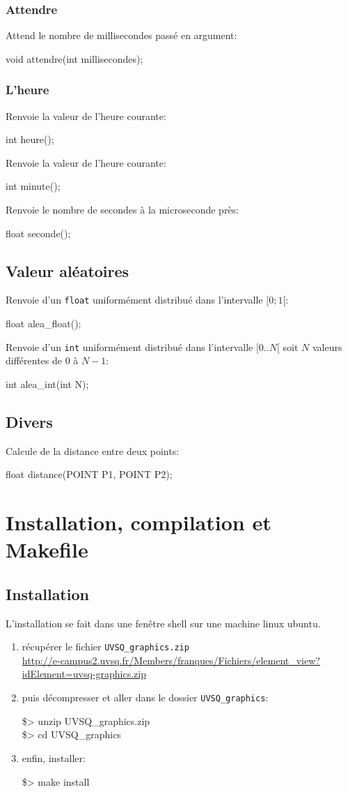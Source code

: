 \documentclass{report}
\newcommand\code[1]{
\begin{mdframed}[linecolor=purple,backgroundcolor=blue!10]
{\tt
#1
}
\end{mdframed}
}
\begin{document}
\subsection{Attendre}
Attend le nombre de millisecondes passé en argument:
\code{
void attendre(int millisecondes);
}

\subsection{L'heure}
Renvoie la valeur de l'heure courante:
\code{
int heure();
}

Renvoie la valeur de l'heure courante:
\code{
int minute();
}

Renvoie le nombre de secondes à la microseconde près:
\code{
float seconde();
}

\section{Valeur aléatoires}
Renvoie d'un \texttt{float} uniformément distribué dans l'intervalle $[0;1[$:
\code{
float alea\_float();
}

Renvoie d'un \texttt{int} uniformément distribué dans l'intervalle $[0..N[$
soit $N$ valeurs différentes de 0 à $N-1$:
\code{
int alea\_int(int N);
}

\section{Divers}
Calcule de la distance entre deux points:
\code{
float distance(POINT P1, POINT P2);
}

\chapter{Installation, compilation et Makefile\label{chap:inst}}
\section{Installation}
L'installation se fait dans une fenêtre shell sur une machine linux ubuntu.
\begin{enumerate}
\item récupérer le fichier \texttt{UVSQ\_graphics.zip}\\
\hspace*{-5mm}\url{http://e-campus2.uvsq.fr/Members/franques/Fichiers/element_view?idElement=uvsq-graphics.zip}
\item puis décompresser et aller dans le dossier \texttt{UVSQ\_graphics}:
\code{
\$> unzip UVSQ\_graphics.zip\\
\$> cd UVSQ\_graphics
}
\item enfin, installer:
\code{
\$> make install
}
\end{enumerate}
\end{document}
